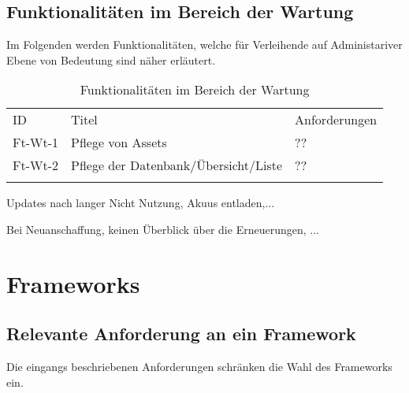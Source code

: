 \subsection{Funktionalitäten im Bereich der Wartung}
\label{subsec:ft-wartung}
Im Folgenden werden Funktionalitäten, welche für Verleihende auf Administariver Ebene von Bedeutung sind
näher erläutert.
\begin{table}[h]
    \centering
    \caption{Funktionalitäten im Bereich der Wartung}
    \begin{tabular}{lll}
        \arrayrulecolor{maincolor}\hline
        \sffamily\color{maincolor}ID & \sffamily\color{maincolor}Titel      &
        \sffamily\color{maincolor}Anforderungen                                  \\
        \arrayrulecolor{maincolor}\hline
        Ft-Wt-1                      & Pflege von Assets                    & ?? \\
        Ft-Wt-2                      & Pflege der Datenbank/Übersicht/Liste & ?? \\
        \arrayrulecolor{maincolor}\hline
    \end{tabular}
    \label{table:Ft-Wt}
\end{table}

Updates nach langer Nicht Nutzung, Akuus entladen,...

Bei Neuanschaffung, keinen Überblick über die Erneuerungen, ...


\section{Frameworks}

\subsection{Relevante Anforderung an ein Framework}
Die eingangs beschriebenen Anforderungen schränken die Wahl des Frameworks ein.


